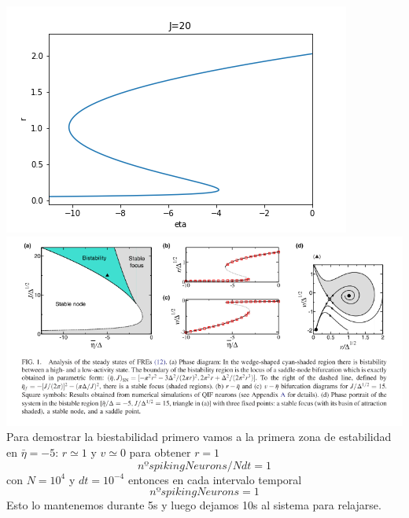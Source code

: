 \documentclass[a4paper]{article}
\begin{document}
\includegraphics[scale=0.7]{r_vs_eta_J20.png}\\
\includegraphics[scale=0.4]{diagramaspaper.png}\\
Para demostrar la biestabilidad primero vamos a la primera zona de estabilidad en $ \bar{\eta} = -5$:
$r\simeq 1$ y $ v\simeq 0$
para obtener  $r = 1$
$$nºspikingNeurons/Ndt = 1$$
con $N = 10^4$ y $dt = 10^{-4}$
entonces en cada intervalo temporal
$$nºspikingNeurons = 1$$
Esto lo mantenemos durante 5s y luego dejamos 10s al sistema para relajarse.
\end{document}
